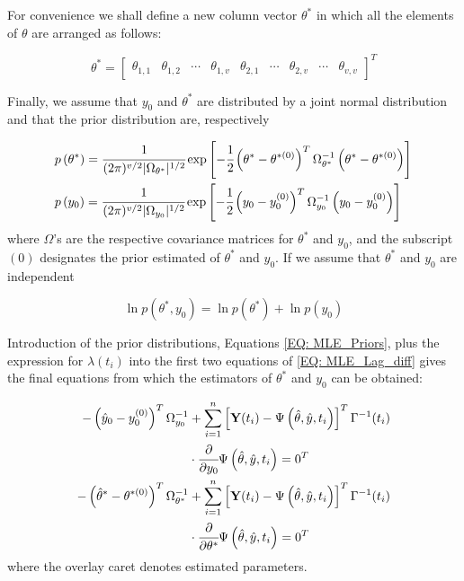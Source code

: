 \documentclass[a4paper,fleqn]{cas-dc}
\begin{document}
For convenience we shall define a new column vector $\theta^*$ in which all the elements of $\theta$ are arranged as follows:

\begin{equation}
	\theta^* = \begin{bmatrix}
		\theta_{1,1} & \theta_{1,2} & \cdots & \theta_{1,v} & \theta_{2,1} & \cdots & \theta_{2,v} & \cdots & \theta_{v,v}
	\end{bmatrix}^T	
\end{equation}

Finally, we assume that $y_0$ and $\theta^*$ are distributed by a joint normal distribution and that the prior distribution are, respectively

\begin{subequations} \label{EQ: MLE_Priors}
	\begin{align}
		&p\left( \theta^* \right) = \cfrac{1}{ (2\pi)^{v/2} |\Omega_{\theta^*}|^{1/2} } \exp \left[ -\cfrac{1}{2} \left( \theta^* - \theta^{*(0)} \right)^T \Omega_{\theta^*}^{-1} \left( \theta^* - \theta^{*(0)} \right) \right] \\
		&p\left( y_0 \right) = \cfrac{1}{ (2\pi)^{v/2} |\Omega_{y_0}|^{1/2} } \exp \left[ -\cfrac{1}{2} \left( y_0 - y_0^{(0)} \right)^T \Omega_{y_0}^{-1} \left( y_0 - y_0^{(0)} \right) \right] 
	\end{align}
\end{subequations}
where $\Omega$'s are the respective covariance matrices for $\theta^*$ and $y_0$, and the subscript $(0)$ designates the prior estimated of $\theta^*$ and $y_0$. If we assume that $\theta^*$ and $y_0$ are independent

\begin{equation}
	\ln p(\theta^*,y_0) = \ln p(\theta^*) + \ln p(y_0)
\end{equation}

Introduction of the prior distributions, Equations \ref{EQ: MLE_Priors}, plus the expression for $\lambda(t_i)$ into the first two equations of \ref{EQ: MLE_Lag_diff} gives the final equations from which the estimators of $\theta^*$ and $y_0$ can be obtained:

\begin{subequations} 
	\begin{align}
	-\left( \hat{y}_0 - y_0^{(0)} \right)^T \Omega_{y_0}^{-1} &+ \sum_{i=1}^{n}\left[ \textbf{Y}(t_i) - \Psi\left( \hat{\theta}, \hat{y}, t_i \right) \right]^T \Gamma^{-1}(t_i) \nonumber \\ 
	&\cdot \cfrac{\partial}{\partial y_0} \Psi\left( \hat{\theta}, \hat{y}, t_i \right) = 0^T \\
	-\left( \hat{\theta}^* - \theta^{*(0)} \right)^T \Omega_{\theta^*}^{-1} &+ \sum_{i=1}^{n}\left[ \textbf{Y}(t_i) - \Psi\left( \hat{\theta}, \hat{y}, t_i \right) \right]^T \Gamma^{-1}(t_i) \nonumber \\ 
	&\cdot \cfrac{\partial}{\partial \theta^*} \Psi\left( \hat{\theta}, \hat{y}, t_i \right) = 0^T \nonumber \\
	\end{align}
\end{subequations}
where the overlay caret denotes estimated parameters.
\end{document}

